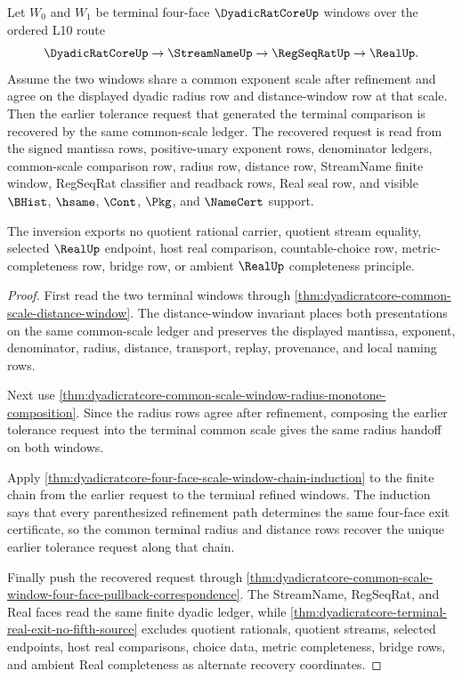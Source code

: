 \begin{theorem}
\label{thm:dyadicratcore-common-scale-tolerance-inversion}
Let $W_0$ and $W_1$ be terminal four-face $\DyadicRatCoreUp$ windows over the ordered L10 route
$$
\DyadicRatCoreUp \to \StreamNameUp \to \RegSeqRatUp \to \RealUp .
$$
Assume the two windows share a common exponent scale after refinement and agree on the displayed dyadic radius row and distance-window row at that scale. Then the earlier tolerance request that generated the terminal comparison is recovered by the same common-scale ledger. The recovered request is read from the signed mantissa rows, positive-unary exponent rows, denominator ledgers, common-scale comparison row, radius row, distance row, StreamName finite window, RegSeqRat classifier and readback rows, Real seal row, and visible $\BHist$, $\hsame$, $\Cont$, $\Pkg$, and $\NameCert$ support.

The inversion exports no quotient rational carrier, quotient stream equality, selected $\RealUp$ endpoint, host real comparison, countable-choice row, metric-completeness row, bridge row, or ambient $\RealUp$ completeness principle.
\end{theorem}
\begin{proof}
First read the two terminal windows through \autoref{thm:dyadicratcore-common-scale-distance-window}. The distance-window invariant places both presentations on the same common-scale ledger and preserves the displayed mantissa, exponent, denominator, radius, distance, transport, replay, provenance, and local naming rows.

Next use \autoref{thm:dyadicratcore-common-scale-window-radius-monotone-composition}. Since the radius rows agree after refinement, composing the earlier tolerance request into the terminal common scale gives the same radius handoff on both windows.

Apply \autoref{thm:dyadicratcore-four-face-scale-window-chain-induction} to the finite chain from the earlier request to the terminal refined windows. The induction says that every parenthesized refinement path determines the same four-face exit certificate, so the common terminal radius and distance rows recover the unique earlier tolerance request along that chain.

Finally push the recovered request through \autoref{thm:dyadicratcore-common-scale-window-four-face-pullback-correspondence}. The StreamName, RegSeqRat, and Real faces read the same finite dyadic ledger, while \autoref{thm:dyadicratcore-terminal-real-exit-no-fifth-source} excludes quotient rationals, quotient streams, selected endpoints, host real comparisons, choice data, metric completeness, bridge rows, and ambient Real completeness as alternate recovery coordinates.
\end{proof}
